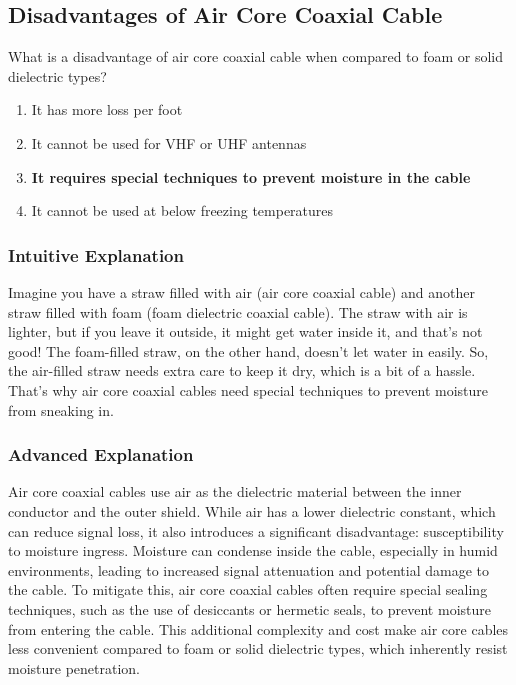 \subsection{Disadvantages of Air Core Coaxial Cable}
\label{T7C11}

\begin{tcolorbox}[colback=gray!10!white,colframe=black!75!black,title=T7C11]
What is a disadvantage of air core coaxial cable when compared to foam or solid dielectric types?
\begin{enumerate}[label=\Alph*)]
    \item It has more loss per foot
    \item It cannot be used for VHF or UHF antennas
    \item \textbf{It requires special techniques to prevent moisture in the cable}
    \item It cannot be used at below freezing temperatures
\end{enumerate}
\end{tcolorbox}

\subsubsection*{Intuitive Explanation}
Imagine you have a straw filled with air (air core coaxial cable) and another straw filled with foam (foam dielectric coaxial cable). The straw with air is lighter, but if you leave it outside, it might get water inside it, and that’s not good! The foam-filled straw, on the other hand, doesn’t let water in easily. So, the air-filled straw needs extra care to keep it dry, which is a bit of a hassle. That’s why air core coaxial cables need special techniques to prevent moisture from sneaking in.

\subsubsection*{Advanced Explanation}
Air core coaxial cables use air as the dielectric material between the inner conductor and the outer shield. While air has a lower dielectric constant, which can reduce signal loss, it also introduces a significant disadvantage: susceptibility to moisture ingress. Moisture can condense inside the cable, especially in humid environments, leading to increased signal attenuation and potential damage to the cable. To mitigate this, air core coaxial cables often require special sealing techniques, such as the use of desiccants or hermetic seals, to prevent moisture from entering the cable. This additional complexity and cost make air core cables less convenient compared to foam or solid dielectric types, which inherently resist moisture penetration.

